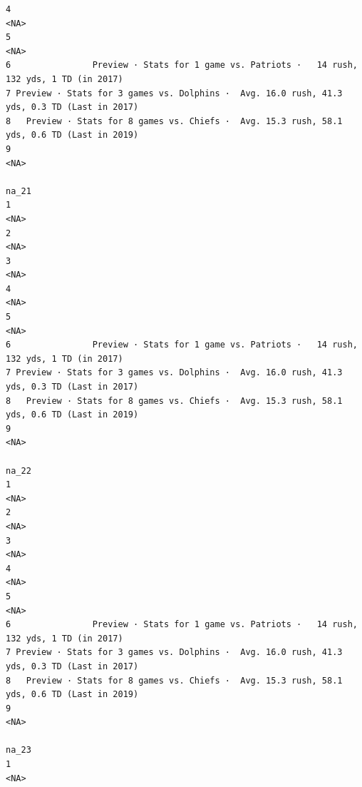 \documentclass[
]{article}
\begin{document}
\begin{verbatim}
4                                                                                        <NA>
5                                                                                        <NA>
6                Preview · Stats for 1 game vs. Patriots ·   14 rush, 132 yds, 1 TD (in 2017)
7 Preview · Stats for 3 games vs. Dolphins ·  Avg. 16.0 rush, 41.3 yds, 0.3 TD (Last in 2017)
8   Preview · Stats for 8 games vs. Chiefs ·  Avg. 15.3 rush, 58.1 yds, 0.6 TD (Last in 2019)
9                                                                                        <NA>
                                                                                        na_21
1                                                                                        <NA>
2                                                                                        <NA>
3                                                                                        <NA>
4                                                                                        <NA>
5                                                                                        <NA>
6                Preview · Stats for 1 game vs. Patriots ·   14 rush, 132 yds, 1 TD (in 2017)
7 Preview · Stats for 3 games vs. Dolphins ·  Avg. 16.0 rush, 41.3 yds, 0.3 TD (Last in 2017)
8   Preview · Stats for 8 games vs. Chiefs ·  Avg. 15.3 rush, 58.1 yds, 0.6 TD (Last in 2019)
9                                                                                        <NA>
                                                                                        na_22
1                                                                                        <NA>
2                                                                                        <NA>
3                                                                                        <NA>
4                                                                                        <NA>
5                                                                                        <NA>
6                Preview · Stats for 1 game vs. Patriots ·   14 rush, 132 yds, 1 TD (in 2017)
7 Preview · Stats for 3 games vs. Dolphins ·  Avg. 16.0 rush, 41.3 yds, 0.3 TD (Last in 2017)
8   Preview · Stats for 8 games vs. Chiefs ·  Avg. 15.3 rush, 58.1 yds, 0.6 TD (Last in 2019)
9                                                                                        <NA>
                                                                                        na_23
1                                                                                        <NA>

\end{verbatim}
\end{document}

